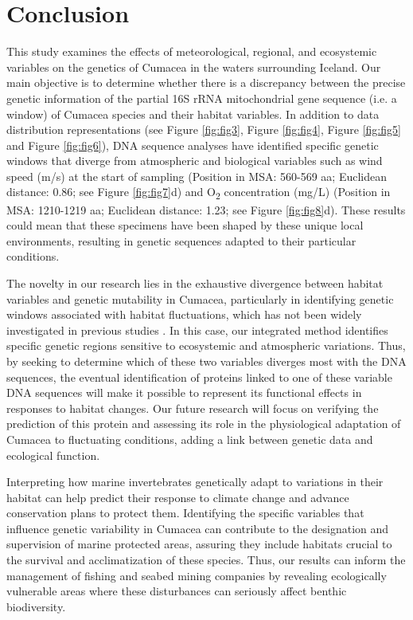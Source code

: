 {\section{Conclusion}\label{conclusion}
This study examines the effects of meteorological, regional, and ecosystemic variables on the genetics of Cumacea in the waters surrounding Iceland. Our main objective is to determine whether there is a discrepancy between the precise genetic information of the partial 16S rRNA mitochondrial gene sequence (i.e. a window) of Cumacea species and their habitat variables. In addition to data distribution representations (see Figure \ref{fig:fig3}, Figure \ref{fig:fig4}, Figure \ref{fig:fig5} and Figure \ref{fig:fig6}), DNA sequence analyses have identified specific genetic windows that diverge from atmospheric and biological variables such as wind speed (m/s) at the start of sampling (Position in MSA: 560-569 aa; Euclidean distance: 0.86; see Figure \ref{fig:fig7}d) and O\textsubscript{2} concentration (mg/L) (Position in MSA: 1210-1219 aa; Euclidean distance: 1.23; see Figure \ref{fig:fig8}d). These results could mean that these specimens have been shaped by these unique local environments, resulting in genetic sequences adapted to their particular conditions.

The novelty in our research lies in the exhaustive divergence between habitat variables and genetic mutability in Cumacea, particularly in identifying genetic windows associated with habitat fluctuations, which has not been widely investigated in previous studies \citep{manel2003landscape, vrijenhoek2009cryptic}. In this case, our integrated method identifies specific genetic regions sensitive to ecosystemic and atmospheric variations. Thus, by seeking to determine which of these two variables diverges most with the DNA sequences, the eventual identification of proteins linked to one of these variable DNA sequences will make it possible to represent its functional effects in responses to habitat changes. Our future research will focus on verifying the prediction of this protein and assessing its role in the physiological adaptation of Cumacea to fluctuating conditions, adding a link between genetic data and ecological function.

Interpreting how marine invertebrates genetically adapt to variations in their habitat can help predict their response to climate change and advance conservation plans to protect them. Identifying the specific variables that influence genetic variability in Cumacea can contribute to the designation and supervision of marine protected areas, assuring they include habitats crucial to the survival and acclimatization of these species. Thus, our results can inform the management of fishing and seabed mining companies by revealing ecologically vulnerable areas where these disturbances can seriously affect benthic biodiversity.

}
